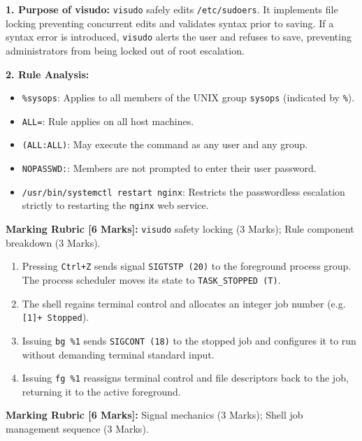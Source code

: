 \begin{examsol}
\textbf{1. Purpose of visudo:}
\texttt{visudo} safely edits \texttt{/etc/sudoers}. It implements file locking preventing concurrent edits and validates syntax prior to saving. If a syntax error is introduced, \texttt{visudo} alerts the user and refuses to save, preventing administrators from being locked out of root escalation.

\textbf{2. Rule Analysis:}
\begin{itemize}[leftmargin=1.5em]
    \item \texttt{\%sysops}: Applies to all members of the UNIX group \texttt{sysops} (indicated by \texttt{\%}).
    \item \texttt{ALL=}: Rule applies on all host machines.
    \item \texttt{(ALL:ALL)}: May execute the command as any user and any group.
    \item \texttt{NOPASSWD:}: Members are not prompted to enter their user password.
    \item \texttt{/usr/bin/systemctl restart nginx}: Restricts the passwordless escalation strictly to restarting the \texttt{nginx} web service.
\end{itemize}

\begin{markingrubric}
\textbf{Marking Rubric [6 Marks]:} \texttt{visudo} safety locking (3 Marks); Rule component breakdown (3 Marks).
\end{markingrubric}
\end{examsol}


\begin{examsol}
\begin{enumerate}[leftmargin=1.5em]
    \item Pressing \texttt{Ctrl+Z} sends signal \texttt{SIGTSTP (20)} to the foreground process group. The process scheduler moves its state to \texttt{TASK\_STOPPED (T)}.
    \item The shell regains terminal control and allocates an integer job number (e.g. \texttt{[1]+ Stopped}).
    \item Issuing \texttt{bg \%1} sends \texttt{SIGCONT (18)} to the stopped job and configures it to run without demanding terminal standard input.
    \item Issuing \texttt{fg \%1} reassigns terminal control and file descriptors back to the job, returning it to the active foreground.
\end{enumerate}

\begin{markingrubric}
\textbf{Marking Rubric [6 Marks]:} Signal mechanics (3 Marks); Shell job management sequence (3 Marks).
\end{markingrubric}
\end{examsol}


